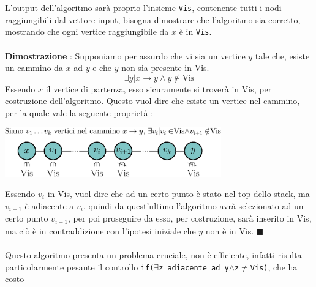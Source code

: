 \documentclass[12pt, letterpaper]{article}
\newcommand{\code}[1]{\colorbox{light-gray}{\texttt{#1}}}
\newcommand{\acc}{\\\hphantom{}\\}
\begin{document}
L'output dell'algoritmo sarà proprio l'insieme \code{Vis}, contenente tutti i nodi raggiungibili dal vettore input,
bisogna dimostrare che l'algoritmo sia corretto, mostrando che ogni vertice raggiungibile da \(x\) è in \code{Vis}.\acc
\textbf{Dimostrazione} : Supponiamo per assurdo che vi sia un vertice \(y\) tale che, esiste un cammino da \(x\) ad
\(y\) e che \(y\) non sia presente in Vis.
$$\exists y|x\rightarrow y\land y\notin\text{Vis}$$
Essendo \(x\) il vertice di partenza, esso sicuramente si troverà in Vis, per costruzione dell'algoritmo. Questo vuol dire che
esiste un vertice nel cammino, per la quale vale la seguente proprietà :
\begin{center}
    \includegraphics[width=0.7\textwidth ]{images/xxx.eps}
\end{center}
Essendo \(v_i\) in Vis, vuol dire che ad un certo punto è stato nel top
dello stack, ma \(v_{i+1}\) è adiacente a \(v_i\), quindi da quest'ultimo l'algoritmo avrà selezionato
ad un certo punto \(v_{i+1}\), per poi proseguire da esso, per costruzione, sarà inserito in Vis, ma ciò è
in contraddizione con l'ipotesi iniziale che \(y\) non è in Vis. \(\blacksquare\)\acc
Questo algoritmo presenta un problema cruciale, non è efficiente, infatti risulta particolarmente
pesante il controllo \code{if(\(\exists\)z adiacente ad y\(\land \)z\(\ne\)Vis)}, che ha costo
\end{document}
